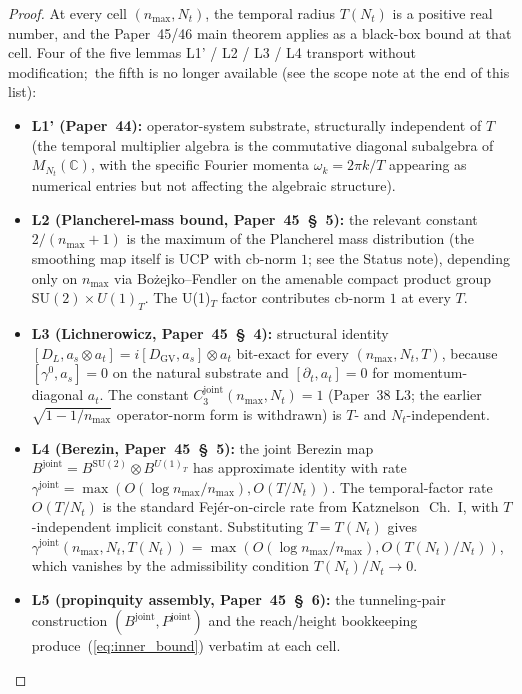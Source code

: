 \documentclass[11pt,a4paper]{article}
\theoremstyle{plain}
\theoremstyle{definition}
\newcommand{\nmax}{n_{\max}}
\newcommand{\Nt}{N_{t}}
\newcommand{\C}{\mathbb{C}}
\newcommand{\SU}{\mathrm{SU}}
\newcommand{\Uone}{U(1)}
\newcommand{\Mat}{M}
\newcommand{\DGV}{D_{\mathrm{GV}}}
\newcommand{\DL}{D_{L}}
\newcommand{\gammajoint}{\gamma^{\mathrm{joint}}}
\newcommand{\Cthreejoint}{C_{3}^{\mathrm{joint}}}
\newcommand{\Bjoint}{B^{\mathrm{joint}}}
\newcommand{\Pjoint}{P^{\mathrm{joint}}}
\begin{document}
\begin{proof}
At every cell $(\nmax, \Nt)$, the temporal radius $T(\Nt)$ is a positive
real number, and the Paper~45/46 main theorem applies as a black-box
bound at that cell. Four of the five lemmas L1' / L2 / L3 / L4
transport without modification;\ the fifth is no longer available (see
the scope note at the end of this list):
\begin{itemize}
\item \textbf{L1' (Paper~44):} operator-system substrate, structurally
independent of $T$ (the temporal multiplier algebra is the commutative
diagonal subalgebra of $\Mat_{\Nt}(\C)$, with the specific Fourier
momenta $\omega_{k} = 2\pi k/T$ appearing as numerical entries but not
affecting the algebraic structure).
\item \textbf{L2 (Plancherel-mass bound, Paper~45~\S~5):}
the relevant constant $2/(\nmax+1)$ is the maximum of the Plancherel
mass distribution (the smoothing map itself is UCP with cb-norm $1$;
see the Status note), depending only on
$\nmax$ via Bo\.zejko--Fendler on the amenable compact product group
$\SU(2)\times\Uone_{T}$. The U(1)$_{T}$ factor contributes cb-norm $1$
at every $T$.
\item \textbf{L3 (Lichnerowicz, Paper~45~\S~4):} structural identity
$[\DL, a_{s}\otimes a_{t}] = i[\DGV, a_{s}]\otimes a_{t}$ bit-exact for
every $(\nmax, \Nt, T)$, because $[\gamma^{0}, a_{s}] = 0$ on the
natural substrate and $[\partial_{t}, a_{t}] = 0$ for momentum-diagonal
$a_{t}$. The constant $\Cthreejoint(\nmax, \Nt) = 1$ (Paper~38 L3; the earlier
$\sqrt{1 - 1/\nmax}$ operator-norm form is withdrawn) is $T$- and
$\Nt$-independent.
\item \textbf{L4 (Berezin, Paper~45~\S~5):} the joint Berezin map
$B^{\mathrm{joint}} = B^{\SU(2)} \otimes B^{U(1)_{T}}$ has approximate
identity with rate
$\gammajoint = \max(O(\log\nmax/\nmax), O(T/\Nt))$. The temporal-factor
rate $O(T/\Nt)$ is the standard Fej\'er-on-circle rate from
Katznelson~\cite{katznelson2004}\,Ch.~I, with $T$-independent implicit
constant. Substituting $T = T(\Nt)$ gives $\gammajoint(\nmax, \Nt,
T(\Nt)) = \max(O(\log\nmax/\nmax), O(T(\Nt)/\Nt))$, which vanishes by
the admissibility condition $T(\Nt)/\Nt \to 0$.
\item \textbf{L5 (propinquity assembly, Paper~45~\S~6):} the
tunneling-pair construction $(\Bjoint, \Pjoint)$ and the
reach/height bookkeeping produce~(\ref{eq:inner_bound}) verbatim at each
cell.


\end{itemize}
\end{proof}
\end{document}
